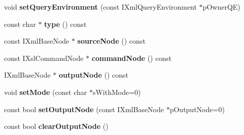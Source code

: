 \begin{DoxyCompactItemize}
\item 
\hypertarget{classgeneral__server_1_1LibXslTransformContext_a362a5ba0243acfab28f3a2886a33ae37}{void {\bfseries set\-Query\-Environment} (const \-I\-Xml\-Query\-Environment $\ast$p\-Owner\-Q\-E)}\label{classgeneral__server_1_1LibXslTransformContext_a362a5ba0243acfab28f3a2886a33ae37}

\item 
\hypertarget{classgeneral__server_1_1LibXslTransformContext_a6679cef354fe053e7588b67408938e19}{const char $\ast$ {\bfseries type} () const }\label{classgeneral__server_1_1LibXslTransformContext_a6679cef354fe053e7588b67408938e19}

\item 
\hypertarget{classgeneral__server_1_1LibXslTransformContext_abff8b7aa8c2fe7cc7b900db20535b928}{const \-I\-Xml\-Base\-Node $\ast$ {\bfseries source\-Node} () const }\label{classgeneral__server_1_1LibXslTransformContext_abff8b7aa8c2fe7cc7b900db20535b928}

\item 
\hypertarget{classgeneral__server_1_1LibXslTransformContext_a6e0180f048d82d0bc3eb39ada9de1060}{const \-I\-Xsl\-Command\-Node $\ast$ {\bfseries command\-Node} () const }\label{classgeneral__server_1_1LibXslTransformContext_a6e0180f048d82d0bc3eb39ada9de1060}

\item 
\hypertarget{classgeneral__server_1_1LibXslTransformContext_af14dbe831beb9dd64cd760f199ad2bdf}{\-I\-Xml\-Base\-Node $\ast$ {\bfseries output\-Node} () const }\label{classgeneral__server_1_1LibXslTransformContext_af14dbe831beb9dd64cd760f199ad2bdf}

\item 
\hypertarget{classgeneral__server_1_1LibXslTransformContext_ab3793f7c9b5867eed1b9ca7a074b396d}{void {\bfseries set\-Mode} (const char $\ast$s\-With\-Mode=0)}\label{classgeneral__server_1_1LibXslTransformContext_ab3793f7c9b5867eed1b9ca7a074b396d}

\item 
\hypertarget{classgeneral__server_1_1LibXslTransformContext_ac864177217bd91a7b11ca172cd457869}{const bool {\bfseries set\-Output\-Node} (const \-I\-Xml\-Base\-Node $\ast$p\-Output\-Node=0)}\label{classgeneral__server_1_1LibXslTransformContext_ac864177217bd91a7b11ca172cd457869}

\item 
\hypertarget{classgeneral__server_1_1LibXslTransformContext_aa1e06dfdcf3ca60a6c1834372a699905}{const bool {\bfseries clear\-Output\-Node} ()}\label{classgeneral__server_1_1LibXslTransformContext_aa1e06dfdcf3ca60a6c1834372a699905}


\end{DoxyCompactItemize}
